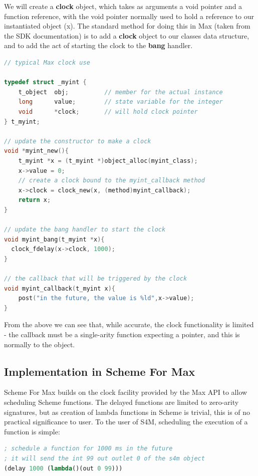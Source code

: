 \documentclass[acmsmall, anonymous, review]{acmart}
\begin{document}
We will create a \textbf{clock} object, which takes as arguments a void pointer and a function
reference, with the void pointer normally used to hold a reference to our instantiated
object (x). The standard method for doing this in Max (taken from the SDK documentation)
is to add a \textbf{clock} object to our classes data structure, and to add the act
of starting the clock to the \textbf{bang} handler.

\begin{lstlisting}[language=C]
// typical Max clock use

typedef struct _myint {
    t_object  obj;          // member for the actual instance 
    long      value;        // state variable for the integer
    void      *clock;       // will hold clock pointer
} t_myint;

// update the constructor to make a clock
void *myint_new(){
    t_myint *x = (t_myint *)object_alloc(myint_class);
    x->value = 0;
    // create a clock bound to the myint_callback method
    x->clock = clock_new(x, (method)myint_callback); 
    return x;
}

// update the bang handler to start the clock
void myint_bang(t_myint *x){
  clock_fdelay(x->clock, 1000);
}

// the callback that will be triggered by the clock
void myint_callback(t_myint x){
    post("in the future, the value is %ld",x->value);
}
\end{lstlisting}


From the above we can see that, while accurate, the clock functionality is limited -
the callback must be a single-arity function expecting a pointer, and this
is normally to the object.


\subsection{Implementation in Scheme For Max}

Scheme For Max builds on the clock facility provided by the Max API to allow scheduling
Scheme functions. The delayed functions are limited to zero-arity signatures, but as
creation of lambda functions in Scheme is trivial, this is of no practical significance to 
user. To the user of S4M, scheduling the execution of a function is simple:

\begin{lstlisting}[language=lisp]
; schedule a function for 1000 ms in the future
; it will send the int 99 out outlet 0 of the s4m object
(delay 1000 (lambda()(out 0 99)))
\end{lstlisting}
\end{document}
